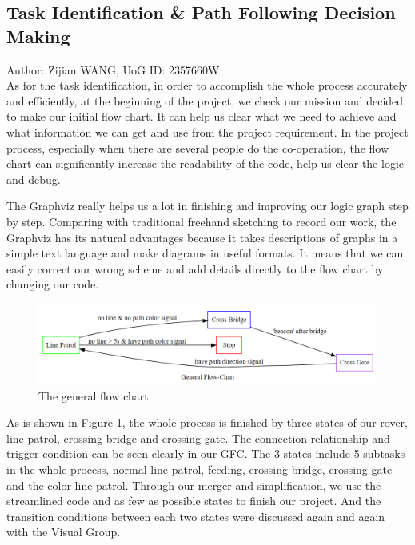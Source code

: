 \subsection{Task Identification \& Path Following Decision Making}
Author: Zijian WANG, UoG ID: 2357660W\\

As for the task identification, in order to accomplish the whole process accurately and efficiently, at the beginning of the project, we check our mission and decided to make our initial flow chart. It can help us clear what we need to achieve and what information we can get and use from the project requirement. In the project process, especially when there are several people do the co-operation, the flow chart can significantly increase the readability of the code, help us clear the logic and debug.

The Graphviz really helps us a lot in finishing and improving our logic graph step by step. Comparing with traditional freehand sketching to record our work, the Graphviz has its natural advantages because it takes descriptions of graphs in a simple text language and make diagrams in useful formats. It means that we can easily correct our wrong scheme and add details directly to the flow chart by changing our code. 

\begin{figure}[htbp]
    \centering
    \includegraphics[width=14cm]{implementation/img_zijian/flowchart.png}
    \caption{The general flow chart}
    \label{fig:flowchart}
\end{figure}

As is shown in Figure \ref{fig:flowchart}, the whole process is finished by three states of our rover, line patrol, crossing bridge and crossing gate. The connection relationship and trigger condition can be seen clearly in our GFC. The 3 states include 5 subtasks in the whole process, normal line patrol, feeding, crossing bridge, crossing gate and the color line patrol. Through our merger and simplification, we use the streamlined code and as few as possible states to finish our project. And the transition conditions between each two states were discussed again and again with the Visual Group.

